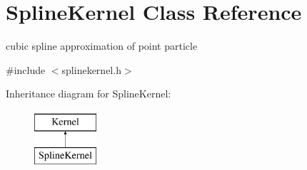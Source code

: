 \hypertarget{classSplineKernel}{\section{\-Spline\-Kernel \-Class \-Reference}
\label{classSplineKernel}
}


cubic spline approximation of point particle  




{\ttfamily \#include $<$splinekernel.\-h$>$}

\-Inheritance diagram for \-Spline\-Kernel\-:\begin{figure}[H]
\begin{center}
\leavevmode
\includegraphics[height=2.000000cm]{classSplineKernel}
\end{center}
\end{figure}
